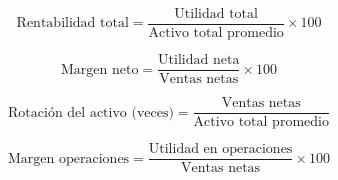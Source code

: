 \begin{equation}\label{eq:rentabilidad_total}
    \text{Rentabilidad total}=\frac{\text{Utilidad total}}{\text{Activo total promedio}}\times{100}
\end{equation}

\begin{equation}\label{eq:margen_neto}
    \text{Margen neto}=\frac{\text{Utilidad neta}}{\text{Ventas netas}}\times{100}
\end{equation}

\begin{equation}\label{eq:rotacion_activo}
    \text{Rotaci\'on del activo (veces)}=\frac{\text{Ventas netas}}{\text{Activo total promedio}}
\end{equation}

\begin{equation}\label{eq:margen_operaciones}
    \text{Margen operaciones} = \frac{\text{Utilidad en operaciones}}{\text{Ventas netas}}\times{100}
\end{equation}

